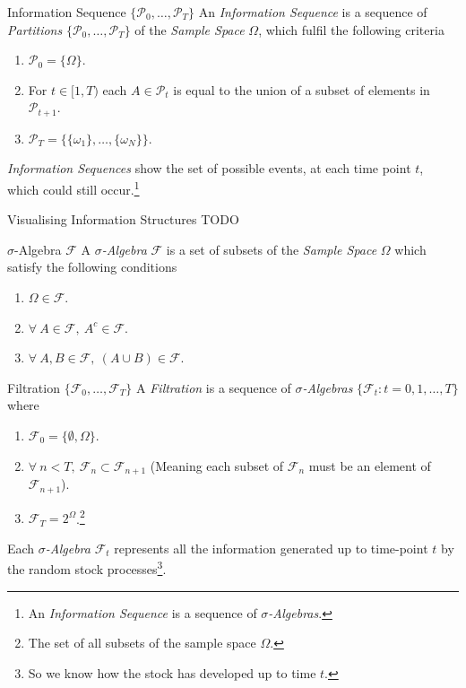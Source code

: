 \documentclass[11pt,a4paper]{article}
\begin{document}
  \begin{definition}{Information Sequence $\{\mathcal{P}_0,\dots,\mathcal{P}_T\}$}
    An \textit{Information Sequence} is a sequence of \textit{Partitions} $\{\mathcal{P}_0,\dots,\mathcal{P}_T\}$ of the \textit{Sample Space} $\Omega$, which fulfil the following criteria
    \begin{enumerate}
      \item $\mathcal{P}_0=\big\{\Omega\big\}$.
      \item For $t\in[1,T)$ each $A\in\mathcal{P}_t$ is equal to the union of a subset of elements in $\mathcal{P}_{t+1}$.
      \item $\mathcal{P}_T=\big\{\{\omega_1\},\dots,\{\omega_N\}\big\}$.
    \end{enumerate}
    \textit{Information Sequences} show the set of possible events, at each time point $t$, which could still occur.\footnote{An \textit{Information Sequence} is a sequence of \textit{$\sigma$-Algebras}.}
  \end{definition}

  \begin{remark}{Visualising Information Structures}
    TODO
  \end{remark}

  \begin{definition}{$\sigma$-Algebra $\mathcal{F}$}
    A \textit{$\sigma$-Algebra} $\mathcal{F}$ is a set of subsets of the \textit{Sample Space} $\Omega$ which satisfy the following conditions
    \begin{enumerate}
      \item $\Omega\in\mathcal{F}$.
      \item $\forall\ A\in\mathcal{F},\ A^c\in\mathcal{F}$.
      \item $\forall\ A,B\in\mathcal{F},\ (A\cup B)\in\mathcal{F}$.
    \end{enumerate}
  \end{definition}

  \begin{definition}{Filtration $\{\mathcal{F}_0,\dots,\mathcal{F}_T\}$}
    A \textit{Filtration} is a sequence of \textit{$\sigma$-Algebras} $\{\mathcal{F}_t:t=0,1,\dots,T\}$ where
    \begin{enumerate}
      \item $\mathcal{F}_0=\{\emptyset,\Omega\}$.
      \item $\forall\ n<T,\ \mathcal{F}_n\subset\mathcal{F}_{n+1}$ (Meaning each subset of $\mathcal{F}_n$ must be an element of $\mathcal{F}_{n+1}$).
      \item $\mathcal{F}_T=2^\Omega$.\footnote{The set of all subsets of the sample space $\Omega$.}
    \end{enumerate}
    Each \textit{$\sigma$-Algebra} $\mathcal{F}_t$ represents all the information generated up to time-point $t$ by the random stock processes\footnote{So we know how the stock has developed up to time $t$.}.
  \end{definition}
\end{document}
